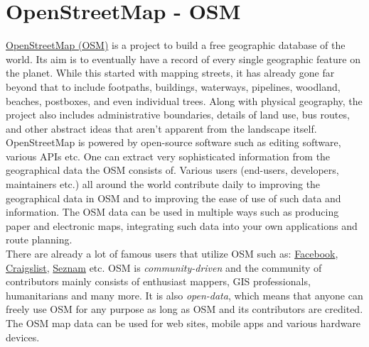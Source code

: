 \section{OpenStreetMap - OSM}
\href{https://www.openstreetmap.org/}{OpenStreetMap (OSM)} is a project to build a free geographic database of the world. Its aim is to eventually have a record of every single geographic feature on the planet. While this started with mapping streets, it has already gone far beyond that to include footpaths, buildings, waterways, pipelines, woodland, beaches, postboxes, and even individual trees. Along with physical geography, the project also includes administrative boundaries, details of land use, bus routes, and other abstract ideas that aren't apparent from the landscape itself. \cite{AboutOSMPackt}\\
\newline
OpenStreetMap is powered by open-source software such as editing software, various APIs etc. One can extract very sophisticated information from the geographical data the OSM consists of. Various users (end-users, developers, maintainers etc.) all around the world contribute daily to improving the geographical data in OSM and to improving the ease of use of such data and information. The OSM data can be used in multiple ways such as producing paper and electronic maps, integrating such data into your own applications and route planning.\\
\newline
There are already a lot of famous users that utilize OSM such as: \href{https://www.facebook.com/}{Facebook}, \href{https://www.craigslist.org/}{Craigslist}, \href{https://www.seznam.cz/}{Seznam} etc. OSM is \textit{community-driven} and the community of contributors mainly consists of enthusiast mappers, GIS professionals, humanitarians and many more. It is also \textit{open-data}, which means that anyone can freely use OSM for any purpose as long as OSM and its contributors are credited. The OSM map data can be used for web sites, mobile apps and various hardware devices.
\newpage
